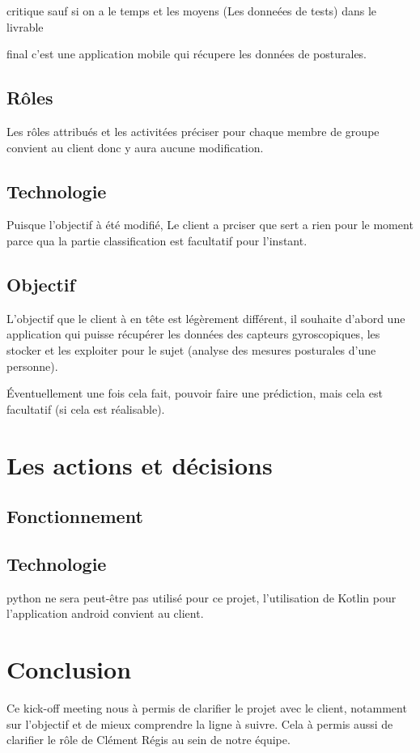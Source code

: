 \documentclass[12pt]{article}
\begin{document}
                critique sauf si on a le temps et les moyens (Les donneées de tests) dans le livrable 

                final c'est une application mobile qui récupere les données de posturales.
                
            \subsection{Rôles}
                Les rôles attribués et les activitées préciser pour chaque membre de groupe convient au client donc y aura aucune modification.

            \subsection{Technologie}
                Puisque l'objectif à été modifié, Le client a prciser que sert a rien pour le moment parce qua la partie classification est facultatif pour l'instant.

            \subsection{Objectif}

                L'objectif que le client à en tête est légèrement différent, il souhaite d'abord une application qui puisse récupérer les données des capteurs gyroscopiques, les stocker et les exploiter pour le sujet (analyse des mesures posturales d'une personne).

                Éventuellement une fois cela fait, pouvoir faire une prédiction, mais cela est facultatif (si cela est réalisable).
            
            \section{Les actions et décisions}

            \subsection{Fonctionnement}

            \subsection{Technologie}
                python ne sera peut-être pas utilisé pour ce projet, l'utilisation de Kotlin pour l'application android convient au client.
            
        \section{Conclusion}
            Ce kick-off meeting nous à permis de clarifier le projet avec le client, notamment sur l'objectif et de mieux comprendre la ligne à suivre. Cela à permis aussi de clarifier le rôle de Clément Régis au sein de notre équipe.
\end{document}
